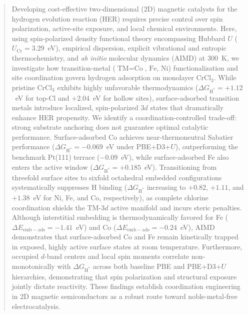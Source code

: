 \documentclass[journal=jacsat,manuscript=article]{achemso}
\begin{document}
\begin{abstract}

  {\color{revcolor}%
    Developing cost-effective two-dimensional (2D) magnetic catalysts for the hydrogen evolution reaction (HER) requires precise control over spin polarization, active-site exposure, and local chemical environments. Here, using spin-polarized density functional theory encompassing Hubbard $U$ ($U_{\text{Cr}} = 3.29$~eV), empirical dispersion, explicit vibrational and entropic thermochemistry, and \textit{ab initio} molecular dynamics (AIMD) at 300~K, we investigate how transition-metal ($\text{TM} = \text{Co}$, $\text{Fe}$, $\text{Ni}$) functionalization and site coordination govern hydrogen adsorption on monolayer $\text{CrCl}_3$. While pristine $\text{CrCl}_3$ exhibits highly unfavorable thermodynamics ($\Delta G_{\text{H}^*} = +1.12$~eV for top-Cl and $+2.04$~eV for hollow sites), surface-adsorbed transition metals introduce localized, spin-polarized $3d$ states that dramatically enhance HER propensity.
    {\color{revcolor}%
      We identify a coordination-controlled trade-off: strong substrate anchoring does not guarantee optimal catalytic performance. Surface-adsorbed Co achieves near-thermoneutral Sabatier performance ($\Delta G_{\text{H}^*} = -0.069$~eV under PBE+D3+$U$), outperforming the benchmark Pt(111) terrace ($-0.09$~eV), while surface-adsorbed Fe also enters the active window ($\Delta G_{\text{H}^*} = +0.185$~eV).
    }
    Transitioning from threefold surface sites to sixfold octahedral embedded configurations systematically suppresses H binding ($\Delta G_{\text{H}^*}$ increasing to $+0.82$, $+1.11$, and $+1.38$~eV for Ni, Fe, and Co, respectively), as complete chlorine coordination shields the TM-$3d$ active manifold and incurs steric penalties. Although interstitial embedding is thermodynamically favored for Fe ($\Delta E_{\mathrm{emb-ads}} = -1.41$~eV) and Co ($\Delta E_{\mathrm{emb-ads}} = -0.24$~eV), AIMD demonstrates that surface-adsorbed Co and Fe remain kinetically trapped in exposed, highly active surface states at room temperature. Furthermore, occupied $d$-band centers and local spin moments correlate non-monotonically with $\Delta G_{\text{H}^*}$ across both baseline PBE and PBE+D3+$U$ hierarchies, demonstrating that spin polarization and structural exposure jointly dictate reactivity. These findings establish coordination engineering in 2D magnetic semiconductors as a robust route toward noble-metal-free electrocatalysis.
  }
\end{abstract}
\end{document}
